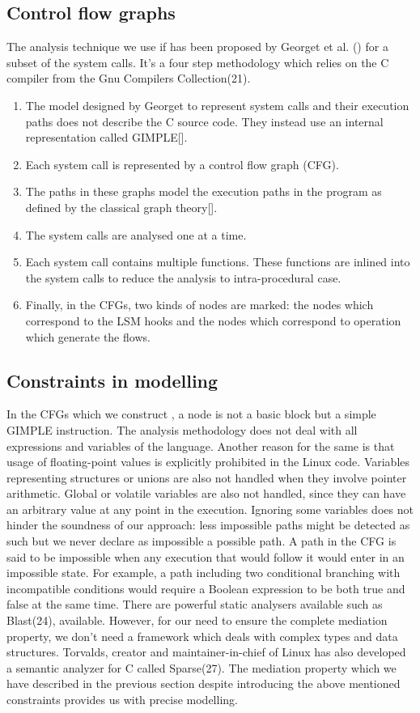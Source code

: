 \subsection{Control flow graphs}
The analysis technique we use if has been proposed by Georget et al. () for a subset of the system calls. It's a four step methodology which relies on the C compiler from the Gnu Compilers Collection(21). 

\begin{enumerate}
	\item The model designed by Georget to represent system calls and their execution paths does not describe the C source code. They instead use an internal representation called GIMPLE[]. 
	\item Each system call is represented by a control flow graph (CFG).
	\item The paths in these graphs model the execution paths in the program as defined by the classical graph theory[].
	\item The system calls are analysed one at a time. 
	\item Each system call contains multiple functions. These functions are inlined into the system calls to reduce the analysis to intra-procedural case. 
	\item Finally, in the CFGs, two kinds of nodes are marked: the nodes which correspond to the LSM hooks and the nodes which correspond to operation which generate the flows. 
	\end{enumerate}

\subsection{Constraints in modelling}
In the CFGs which we construct , a node is not a basic block but a simple GIMPLE instruction. The analysis methodology does not deal with all expressions and variables of the language. Another reason for the same is that usage of floating-point values is explicitly prohibited in the Linux code. Variables representing structures or unions are also not handled when they involve pointer arithmetic. Global or volatile variables are also not handled, since they can have an arbitrary value at any point in the execution. Ignoring some variables does not hinder the soundness of
our approach: less impossible paths might be detected as such but
we never declare as impossible a possible path. A path in the CFG is said to be impossible when any execution
that would follow it would enter in an impossible state. For example,
a path including two conditional branching with incompatible
conditions would require a Boolean expression to be both true and
false at the same time. 
\vskip 0.1in
There are powerful static analysers available such as Blast(24), available. However, for our need to ensure the complete mediation property, we don't need a framework which deals with complex types and data structures. Torvalds, creator and maintainer-in-chief of Linux has also developed a semantic analyzer for C called Sparse(27).
\vskip 0.1in
The mediation property which we have described in the previous section despite introducing the above mentioned constraints provides us with precise modelling.


